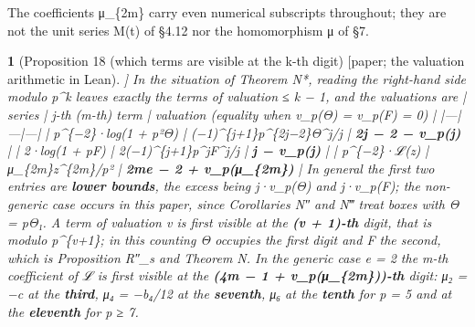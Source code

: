 \documentclass[11pt,a4paper]{article}
\theoremstyle{named}
\newtheorem*{namedthm}{}
\begin{document}
The coefficients μ\_\{2m\} carry even numerical subscripts throughout; they are not the unit series M(t) of §4.12 nor the homomorphism μ of §7.

\begin{namedthm}[Proposition 18 (which terms are visible at the k-th digit) [paper; the valuation arithmetic in Lean]]
In the situation of Theorem N*, reading the right-hand side modulo p\textasciicircum{}k leaves exactly the terms of valuation ≤ k − 1, and the valuations are
| series | j-th (m-th) term | valuation (equality when v\_p(Θ) = v\_p(F) = 0) | |---|---|---| | p\textasciicircum{}\{−2\}·log(1 + p²Θ) | (−1)\textasciicircum{}\{j+1\}p\textasciicircum{}\{2j−2\}Θ\textasciicircum{}j/j | \textbf{2j − 2 − v\_p(j)} | | 2·log(1 + pF) | 2(−1)\textasciicircum{}\{j+1\}p\textasciicircum{}jF\textasciicircum{}j/j | \textbf{j − v\_p(j)} | | p\textasciicircum{}\{−2\}·ℒ(z) | μ\_\{2m\}z\textasciicircum{}\{2m\}/p² | \textbf{2me − 2 + v\_p(μ\_\{2m\})} |
In general the first two entries are \textbf{lower bounds}, the excess being j·v\_p(Θ) and j·v\_p(F); the non-generic case occurs in this paper, since Corollaries N″ and N‴ treat boxes with Θ = pΘ₁. A term of valuation v is first visible at the \textbf{(v + 1)-th} digit, that is modulo p\textasciicircum{}\{v+1\}; in this counting Θ occupies the first digit and F the second, which is Proposition R″\_s and Theorem N. In the generic case e = 2 the m-th coefficient of ℒ is first visible at the \textbf{(4m − 1 + v\_p(μ\_\{2m\}))-th} digit: μ₂ = −c at the \textbf{third}, μ₄ = −b₄/12 at the \textbf{seventh}, μ₆ at the \textbf{tenth} for p = 5 and at the \textbf{eleventh} for p ≥ 7.
\end{namedthm}
\end{document}
